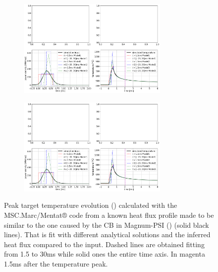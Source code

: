\begin{figure}
     \centering
     \begin{subfigure}{0.7\linewidth}
         \centering
        \hspace*{-5mm}
         \includegraphics[width=0.8\textwidth,trim={510 5 5 330},clip]{Chapters/chapter3/figs/Figure_3.png}
         \caption{\phantom{wew}}
         \label{fig:IR7a}
     \end{subfigure}
     \hfill
     \begin{subfigure}{0.7\linewidth}
         \centering
         \includegraphics[width=0.8\textwidth,trim={5 5 515 330},clip]{Chapters/chapter3/figs/Figure_3.png}
         \caption{\phantom{wew}}
         \label{fig:IR7b}
     \end{subfigure}
        \caption{Peak target temperature evolution () calculated with the MSC.Marc/Mentat® code from a known heat flux profile made to be similar to the one caused by the CB in Magnum-PSI () (solid black lines). That is fit with different analytical solutions and the inferred heat flux compared to the input. Dashed lines are obtained fitting from 1.5 to 30ms while solid ones the entire time axis. In magenta 1.5ms after the temperature peak.}
        \label{fig:IR7}
\end{figure}

